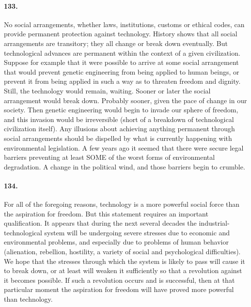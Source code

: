 \documentclass[12pt]{book}
\begin{document}
\paragraph{133.}  No social arrangements, whether laws, institutions, customs or ethical codes, can provide permanent protection against technology. History shows that all social arrangements are transitory; they all change or break down eventually. But technological advances are permanent within the context of a given civilization. Suppose for example that it were possible to arrive at some social arrangement that would prevent genetic engineering from being applied to human beings, or prevent it from being applied in such a way as to threaten freedom and dignity. Still, the technology would remain, waiting. Sooner or later the social arrangement would break down. Probably sooner, given the pace of change in our society. Then genetic engineering would begin to invade our sphere of freedom, and this invasion would be irreversible (short of a breakdown of technological civilization itself). Any illusions about achieving anything permanent through social arrangements should be dispelled by what is currently happening with environmental legislation. A few years ago it seemed that there were secure legal barriers preventing at least SOME of the worst forms of environmental degradation.  A change in the political wind, and those barriers begin to crumble.


\paragraph{134.} For all of the foregoing reasons, technology is a more powerful social force than the aspiration for freedom. But this statement requires an important qualification. It appears that during the next several decades the industrial-technological system will be undergoing severe stresses due to economic and environmental problems, and especially due to problems of human behavior (alienation, rebellion, hostility, a variety of social and psychological difficulties). We hope that the stresses through which the system is likely to pass will cause it to break down, or at least will weaken it sufficiently so that a revolution against it becomes possible. If such a revolution occurs and is successful, then at that particular moment the aspiration for freedom will have proved more powerful than technology.
\end{document}
